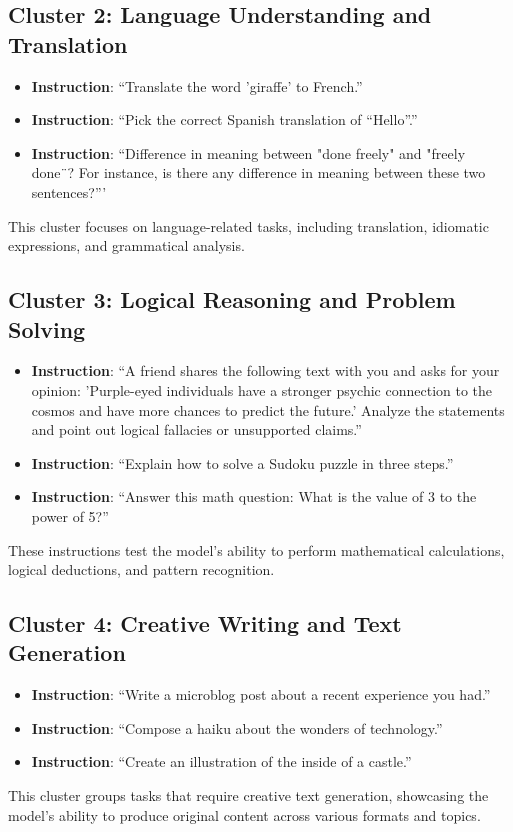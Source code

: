 \subsection{Cluster 2: Language Understanding and Translation}
\begin{itemize}[leftmargin=*]
    \item \textbf{Instruction}: ``Translate the word 'giraffe' to French.''
    \item \textbf{Instruction}: ``Pick the correct Spanish translation of “Hello”.''
    \item \textbf{Instruction}: ``Difference in meaning between "done freely" and "freely done¨? For instance, is there any difference in meaning between these two sentences?'''
\end{itemize}
This cluster focuses on language-related tasks, including translation, idiomatic expressions, and grammatical analysis.

\subsection{Cluster 3: Logical Reasoning and Problem Solving}
\begin{itemize}[leftmargin=*]
    \item \textbf{Instruction}: ``A friend shares the following text with you and asks for your opinion: 'Purple-eyed individuals have a stronger psychic connection to the cosmos and have more chances to predict the future.' Analyze the statements and point out logical fallacies or unsupported claims.''
    \item \textbf{Instruction}: ``Explain how to solve a Sudoku puzzle in three steps.''
    \item \textbf{Instruction}: ``Answer this math question: What is the value of 3 to the power of 5?''
\end{itemize}
These instructions test the model's ability to perform mathematical calculations, logical deductions, and pattern recognition.

\subsection{Cluster 4: Creative Writing and Text Generation}
\begin{itemize}[leftmargin=*]
    \item \textbf{Instruction}: ``Write a microblog post about a recent experience you had.''
    \item \textbf{Instruction}: ``Compose a haiku about the wonders of technology.''
    \item \textbf{Instruction}: ``Create an illustration of the inside of a castle.''
\end{itemize}
This cluster groups tasks that require creative text generation, showcasing the model's ability to produce original content across various formats and topics.


